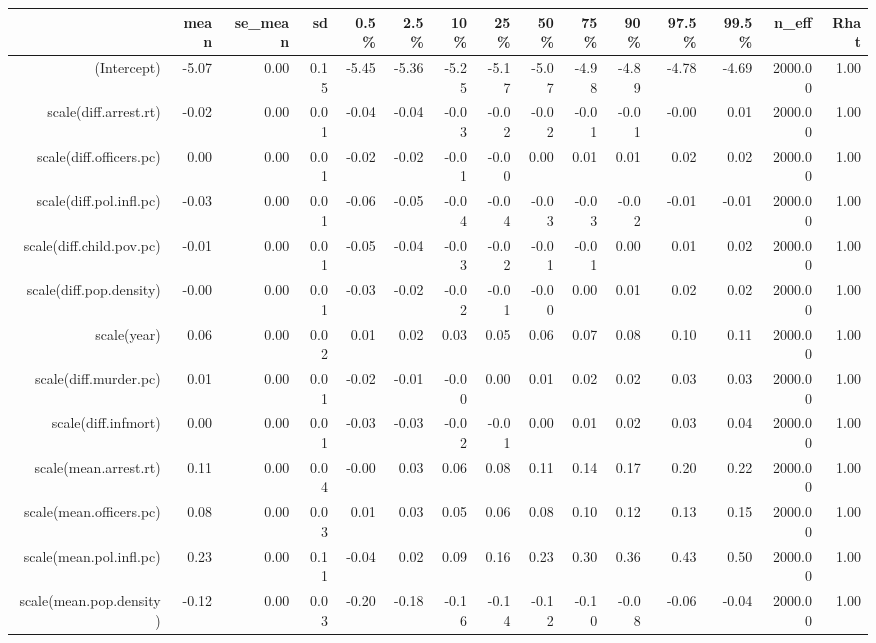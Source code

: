 \begin{table}[ht]
\centering
\begin{tabular}{rrrrrrrrrrrrrrr}
  \hline
 & mean & se\_mean & sd & 0.5\% & 2.5\% & 10\% & 25\% & 50\% & 75\% & 90\% & 97.5\% & 99.5\% & n\_eff & Rhat \\ 
  \hline
(Intercept) & -5.07 & 0.00 & 0.15 & -5.45 & -5.36 & -5.25 & -5.17 & -5.07 & -4.98 & -4.89 & -4.78 & -4.69 & 2000.00 & 1.00 \\ 
  scale(diff.arrest.rt) & -0.02 & 0.00 & 0.01 & -0.04 & -0.04 & -0.03 & -0.02 & -0.02 & -0.01 & -0.01 & -0.00 & 0.01 & 2000.00 & 1.00 \\ 
  scale(diff.officers.pc) & 0.00 & 0.00 & 0.01 & -0.02 & -0.02 & -0.01 & -0.00 & 0.00 & 0.01 & 0.01 & 0.02 & 0.02 & 2000.00 & 1.00 \\ 
  scale(diff.pol.infl.pc) & -0.03 & 0.00 & 0.01 & -0.06 & -0.05 & -0.04 & -0.04 & -0.03 & -0.03 & -0.02 & -0.01 & -0.01 & 2000.00 & 1.00 \\ 
  scale(diff.child.pov.pc) & -0.01 & 0.00 & 0.01 & -0.05 & -0.04 & -0.03 & -0.02 & -0.01 & -0.01 & 0.00 & 0.01 & 0.02 & 2000.00 & 1.00 \\ 
  scale(diff.pop.density) & -0.00 & 0.00 & 0.01 & -0.03 & -0.02 & -0.02 & -0.01 & -0.00 & 0.00 & 0.01 & 0.02 & 0.02 & 2000.00 & 1.00 \\ 
  scale(year) & 0.06 & 0.00 & 0.02 & 0.01 & 0.02 & 0.03 & 0.05 & 0.06 & 0.07 & 0.08 & 0.10 & 0.11 & 2000.00 & 1.00 \\ 
  scale(diff.murder.pc) & 0.01 & 0.00 & 0.01 & -0.02 & -0.01 & -0.00 & 0.00 & 0.01 & 0.02 & 0.02 & 0.03 & 0.03 & 2000.00 & 1.00 \\ 
  scale(diff.infmort) & 0.00 & 0.00 & 0.01 & -0.03 & -0.03 & -0.02 & -0.01 & 0.00 & 0.01 & 0.02 & 0.03 & 0.04 & 2000.00 & 1.00 \\ 
  scale(mean.arrest.rt) & 0.11 & 0.00 & 0.04 & -0.00 & 0.03 & 0.06 & 0.08 & 0.11 & 0.14 & 0.17 & 0.20 & 0.22 & 2000.00 & 1.00 \\ 
  scale(mean.officers.pc) & 0.08 & 0.00 & 0.03 & 0.01 & 0.03 & 0.05 & 0.06 & 0.08 & 0.10 & 0.12 & 0.13 & 0.15 & 2000.00 & 1.00 \\ 
  scale(mean.pol.infl.pc) & 0.23 & 0.00 & 0.11 & -0.04 & 0.02 & 0.09 & 0.16 & 0.23 & 0.30 & 0.36 & 0.43 & 0.50 & 2000.00 & 1.00 \\ 
  scale(mean.pop.density) & -0.12 & 0.00 & 0.03 & -0.20 & -0.18 & -0.16 & -0.14 & -0.12 & -0.10 & -0.08 & -0.06 & -0.04 & 2000.00 & 1.00 \\ 

\end{tabular}
\end{table}
